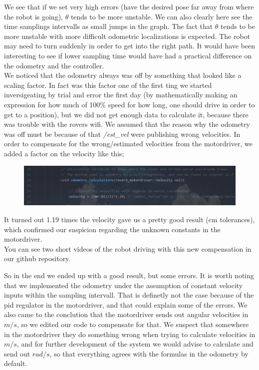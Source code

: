 \documentclass[a4paper,10pt]{article}
\begin{document}
		We see that if we set very high errors (have the desired pose far away from where the robot is going), $\theta$ tends to be more unstable. We can also clearly here see the time samplings
		intervalls as small jumps in the graph. The fact that $\theta$ tends to be more unstable with more difficult odometric localizations is expected. The robot may need to turn suddenly in order
		to get into the right path. It would have been interesting to see if lower sampling time would have had a practical difference on the odometry and the controller.\\
		We noticed that the odometry always was off by something that looked like a scaling factor. In fact was this factor one of the first ting we started inversigeating by trial and error the first day
		(by mathematically making an expression for how much of 100\% speed for how long, one should drive in order to get to a position), but we did not get enough data to calculate it, because
		there was trouble with the rovers wifi. We assumed that the reason why the odometry was off must be because of that \textit{/est\_vel} were publishing wrong velocities. In order to
		compensate for the wrong/estimated velocities from the motordriver, we added a factor on the velocity like this;

		\begin{figure}[H]
		\centering
		\includegraphics[width=1.1\textwidth]{snippet_adjustment_factor.JPG}
		\end{figure}
		It turned out 1.19 times the velocity gave us a pretty good result (cm tolerances), which confirmed our suspicion regarding the unknown constants in the motordriver.\\
		You can see two short videos of the robot driving with this new compensation in our github repository.


		So in the end we ended up with a good result, but some errors. It is worth noting that we implemented the odometry under the assumption of constant velocity inputs within the sampling
		intervall. That is definetly not the case because of the pid regulator in the motordriver, and that could explain some of the errors. We also came to the conclution that the motordriver sends
		out angular velocities in $m/s$, so we edited our code to compensate for that. We suspect that somewhere in the motordriver they do something wrong when trying to calculate velocities in
		$m/s$, and for further development of the system we would advise to calculate and send out $rad/s$, so that everything agrees with the formulas in the odometry by default.
\end{document}
